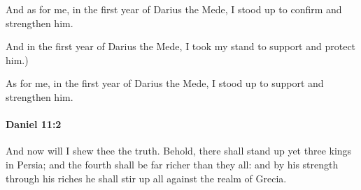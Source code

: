 			\begin{versebox}
					\item[BHS] 
					\item[LXX] 
					\item[ASV] And as for me, in the first year of Darius the Mede, I stood up to confirm and strengthen him.
					\item[NIV] And in the first year of Darius the Mede, I took my stand to support and protect him.)
					\item[NRSV] As for me, in the first year of Darius the Mede, I stood up to support and strengthen him.
			\end{versebox}

		\paragraph{Daniel 11:2} %
			\label{DANIEL-11-2}

			And now will I shew thee the truth. Behold, there shall stand up yet three kings in Persia; and the fourth shall be far richer than they all: and by his strength through his riches he shall stir up all against the realm of Grecia.

